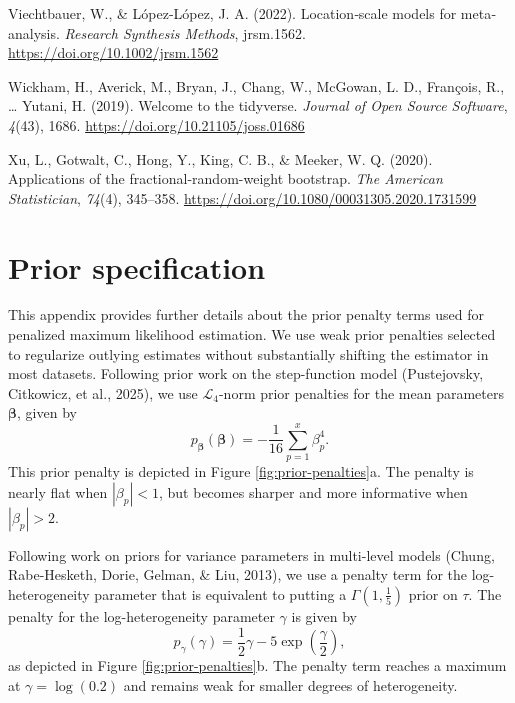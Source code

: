 \documentclass[
  american,
  man, donotrepeattitle,floatsintext]{apa7}
\newlength{\cslhangindent}
\newenvironment{CSLReferences}[2] %
 {\begin{list}{}{%
  \setlength{\itemindent}{0pt}
  \setlength{\leftmargin}{0pt}
  \setlength{\parsep}{0pt}
  \ifodd #1
   \setlength{\leftmargin}{\cslhangindent}
   \setlength{\itemindent}{-1\cslhangindent}
  \fi
  \setlength{\itemsep}{#2\baselineskip}}}
 {\end{list}}
\begin{document}
\begin{CSLReferences}{1}{0}
Viechtbauer, W., \& López‐López, J. A. (2022). Location‐scale models for meta‐analysis. \emph{Research Synthesis Methods}, jrsm.1562. \url{https://doi.org/10.1002/jrsm.1562}

Wickham, H., Averick, M., Bryan, J., Chang, W., McGowan, L. D., François, R., \ldots{} Yutani, H. (2019). Welcome to the {tidyverse}. \emph{Journal of Open Source Software}, \emph{4}(43), 1686. \url{https://doi.org/10.21105/joss.01686}

Xu, L., Gotwalt, C., Hong, Y., King, C. B., \& Meeker, W. Q. (2020). Applications of the fractional-random-weight bootstrap. \emph{The American Statistician}, \emph{74}(4), 345--358. \url{https://doi.org/10.1080/00031305.2020.1731599}

\end{CSLReferences}

\endgroup

\appendix


\section{Prior specification}\label{prior-specification}

This appendix provides further details about the prior penalty terms used for penalized maximum likelihood estimation.
We use weak prior penalties selected to regularize outlying estimates without substantially shifting the estimator in most datasets.
Following prior work on the step-function model (Pustejovsky, Citkowicz, et al., 2025), we use \(\mathcal{L}_4\)-norm prior penalties for the mean parameters \(\boldsymbol\beta\), given by
\begin{equation}
\label{eq:beta-prior}
p_{\boldsymbol\beta}(\boldsymbol\beta) = -\frac{1}{16} \sum_{p=1}^x \beta_p^4.
\end{equation}
This prior penalty is depicted in Figure \ref{fig:prior-penalties}a. The penalty is nearly flat when \(|\beta_p| < 1\), but becomes sharper and more informative when \(|\beta_p| > 2\).

Following work on priors for variance parameters in multi-level models (Chung, Rabe-Hesketh, Dorie, Gelman, \& Liu, 2013), we use a penalty term for the log-heterogeneity parameter that is equivalent to putting a \(\Gamma(1, \frac{1}{5})\) prior on \(\tau\). The penalty for the log-heterogeneity parameter \(\gamma\) is given by
\begin{equation}
\label{eq:gamma-prior}
p_{\gamma}(\gamma) = \frac{1}{2} \gamma - 5 \exp\left(\frac{\gamma}{2}\right),
\end{equation}
as depicted in Figure \ref{fig:prior-penalties}b.
The penalty term reaches a maximum at \(\gamma = \log(0.2)\) and remains weak for smaller degrees of heterogeneity.
\end{document}
